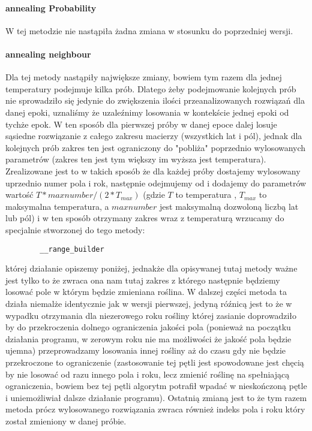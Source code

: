 \documentclass{article}
\begin{document}
 \paragraph{annealing Probability}
 W tej metodzie nie nastąpiła żadna zmiana w stosunku do poprzedniej wersji.

 \paragraph{annealing neighbour}
 Dla tej metody nastąpiły największe zmiany, bowiem tym razem dla jednej temperatury podejmuje kilka prób. Dlatego żeby podejmowanie kolejnych prób nie sprowadziło się jedynie do zwiększenia ilości przeanalizowanych rozwiązań dla danej epoki, uznaliśmy że uzaleźnimy losowania w kontekście jednej epoki od tychże epok. W ten sposób dla pierwszej próby w danej epoce dalej losuje sąsiedne rozwiązanie z całego zakresu macierzy (wszystkich lat i pól), jednak dla kolejnych prób zakres ten jest ograniczony do "pobliża" poprzednio wylosowanych parametrów (zakres ten jest tym większy im wyższa jest temperatura). Zrealizowane jest to w takich sposób że dla każdej próby dostajemy wylosowany uprzednio numer pola i rok, następnie odejmujemy od i dodajemy do parametrów wartość $T*maxnumber/(2*T_{max})$ (gdzie $T$ to temperatura , $T_{max}$ to maksymalna temperatura, a $maxnumber$ jest maksymalną dozwoloną liczbą lat lub pól) i w ten sposób otrzymany zakres wraz z temperaturą wrzucamy do specjalnie stworzonej do tego metody:
 \begin{verbatim}
		__range_builder
	\end{verbatim}
 której działanie opiszemy poniżej, jednakże dla opisywanej tutaj metody ważne jest tylko to że zwraca ona nam tutaj zakres z którego następnie będziemy losować pole w którym będzie zmieniana roślina. W dalszej części metoda ta działa niemalże identycznie jak w wersji pierwszej, jedyną róźnicą jest to że w wypadku otrzymania dla niezerowego roku rośliny której zasianie doprowadziło by do przekroczenia dolnego ograniczenia jakości pola (ponieważ na początku działania programu, w zerowym roku nie ma możliwości że jakość pola będzie ujemna) przeprowadzamy losowania innej rośliny aż do czasu gdy nie będzie przekroczone to ograniczenie (zastosowanie tej pętli jest spowodowane jest chęcią by nie losować od razu innego pola i roku, lecz zmienić roślinę na spełniającą ograniczenia, bowiem bez tej pętli algorytm potrafił wpadać w nieskończoną pętle i uniemożliwiał dalsze działanie programu). Ostatnią zmianą jest to że tym razem metoda prócz wylosowanego rozwiązania zwraca również indeks pola i roku który został zmieniony w danej próbie.
\end{document}
